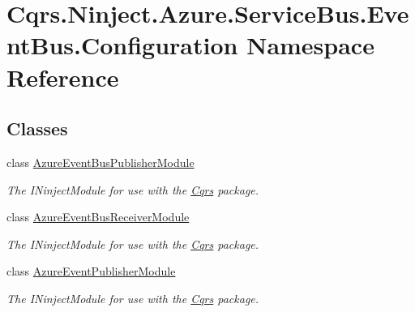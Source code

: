 \hypertarget{namespaceCqrs_1_1Ninject_1_1Azure_1_1ServiceBus_1_1EventBus_1_1Configuration}{}\section{Cqrs.\+Ninject.\+Azure.\+Service\+Bus.\+Event\+Bus.\+Configuration Namespace Reference}
\label{namespaceCqrs_1_1Ninject_1_1Azure_1_1ServiceBus_1_1EventBus_1_1Configuration}
\subsection*{Classes}
\begin{DoxyCompactItemize}
\item 
class \hyperlink{classCqrs_1_1Ninject_1_1Azure_1_1ServiceBus_1_1EventBus_1_1Configuration_1_1AzureEventBusPublisherModule}{Azure\+Event\+Bus\+Publisher\+Module}
\begin{DoxyCompactList}\small\item\em The I\+Ninject\+Module for use with the \hyperlink{namespaceCqrs}{Cqrs} package. \end{DoxyCompactList}\item 
class \hyperlink{classCqrs_1_1Ninject_1_1Azure_1_1ServiceBus_1_1EventBus_1_1Configuration_1_1AzureEventBusReceiverModule}{Azure\+Event\+Bus\+Receiver\+Module}
\begin{DoxyCompactList}\small\item\em The I\+Ninject\+Module for use with the \hyperlink{namespaceCqrs}{Cqrs} package. \end{DoxyCompactList}\item 
class \hyperlink{classCqrs_1_1Ninject_1_1Azure_1_1ServiceBus_1_1EventBus_1_1Configuration_1_1AzureEventPublisherModule}{Azure\+Event\+Publisher\+Module}
\begin{DoxyCompactList}\small\item\em The I\+Ninject\+Module for use with the \hyperlink{namespaceCqrs}{Cqrs} package. \end{DoxyCompactList}\end{DoxyCompactItemize}
